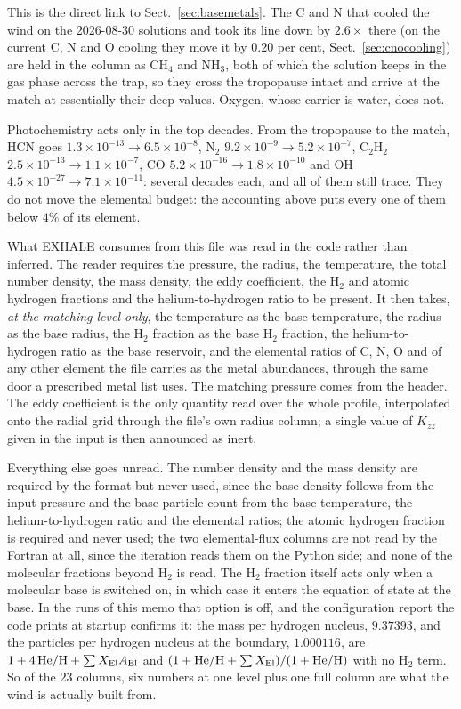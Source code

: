 \documentclass[english,a4paper]{my_memo}
\begin{document}
This is the direct link to Sect.~\ref{sec:basemetals}. The C and N that
cooled the wind on the 2026-08-30 solutions and took its line down by
$2.6\times$ there (on the current C, N and O cooling they move it by $0.20$
per cent, Sect.~\ref{sec:cnocooling}) are held in the column as
CH$_4$ and NH$_3$, both of which the solution keeps in the gas phase across
the trap, so they cross the tropopause intact and arrive at the match at
essentially their deep values. Oxygen, whose carrier is water, does not.

\medskip
\noindent Photochemistry acts only in the top decades. From the tropopause to
the match, HCN goes
$1.3\times10^{-13} \rightarrow 6.5\times10^{-8}$, N$_2$
$9.2\times10^{-9} \rightarrow 5.2\times10^{-7}$, C$_2$H$_2$
$2.5\times10^{-13} \rightarrow 1.1\times10^{-7}$, CO
$5.2\times10^{-16} \rightarrow 1.8\times10^{-10}$ and OH
$4.5\times10^{-27} \rightarrow 7.1\times10^{-11}$: several decades each, and
all of them still trace. They do not move the elemental budget: the
accounting above puts every one of them below $4\%$ of its element.

\medskip
\noindent What EXHALE consumes from this file was read in the code rather
than inferred. The reader requires the pressure, the radius, the temperature,
the total number density, the mass density, the eddy coefficient, the H$_2$
and atomic hydrogen fractions and the helium-to-hydrogen ratio to be present.
It then takes, \emph{at the matching level only}, the temperature as the base
temperature, the radius as the base radius, the H$_2$ fraction as the base
H$_2$ fraction, the helium-to-hydrogen ratio as the base reservoir, and the
elemental ratios of C, N, O and of any other element the file carries as the
metal abundances, through the same door a prescribed metal list uses. The
matching pressure comes from the header. The eddy coefficient is the only
quantity read over the whole profile, interpolated onto the radial grid
through the file's own radius column; a single value of $K_{zz}$ given in the
input is then announced as inert.

Everything else goes unread. The number density and the mass density are
required by the format but never used, since the base density follows from
the input pressure and the base particle count from the base temperature, the
helium-to-hydrogen ratio and the elemental ratios; the atomic hydrogen
fraction is required and never used; the two elemental-flux columns are not
read by the Fortran at all, since the iteration reads them on the Python
side; and none of the molecular fractions beyond H$_2$ is read. The H$_2$
fraction itself acts only when a molecular base is switched on, in which case
it enters the equation of state at the base. In the runs of this memo that
option is off, and the configuration report the code prints at startup
confirms it: the mass per hydrogen nucleus, $9.37393$, and the particles per
hydrogen nucleus at the boundary, $1.000116$, are
$1 + 4\,{\rm He/H} + \sum X_{\rm El}A_{\rm El}$ and
$(1 + {\rm He/H} + \sum X_{\rm El})/(1 + {\rm He/H})$ with no H$_2$ term. So
of the $23$ columns, six numbers at one level plus one full column are what
the wind is actually built from.
\end{document}
